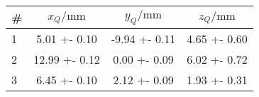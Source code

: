 \begin{tabular}{lSSS}
\toprule

{\#} & {$x_Q / \si{\milli\metre}$} & {$y_Q / \si{\milli\metre}$} & {$z_Q / \si{\milli\metre}$}\\

\midrule

1 & 5.01 +- 0.10 & -9.94 +- 0.11 & 4.65 +- 0.60 \\
2 & 12.99 +- 0.12 & 0.00 +- 0.09 & 6.02 +- 0.72 \\
3 & 6.45 +- 0.10 & 2.12 +- 0.09 & 1.93 +- 0.31\\

\bottomrule
\end{tabular}